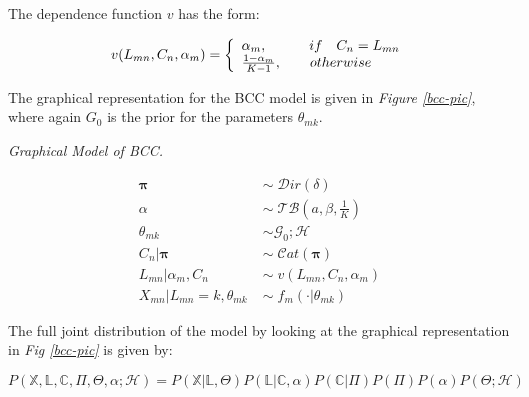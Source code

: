 The dependence function $v$ has the form:

\begin{equation}
	v(L_{mn}, C_{n}, \alpha_{m}) = \left\{
	\begin{array}{l l}
		\alpha_{m},\quad \quad \quad if\quad C_{n} = L_{mn}\\
		\frac{1-\alpha_{m}}{K-1},\quad \quad otherwise
	\end{array}\right.
\end{equation}

The graphical representation for the BCC model is given in \emph{Figure \ref{bcc-pic}}, where again $G_{0}$ is the prior for the parameters $\theta_{mk}$.

\begin{minipage}{0.5\textwidth}%
  \hfill
  \begin{center}
	
	\emph{Graphical Model of BCC.}
  \end{center}
\end{minipage}
\begin{minipage}{0.4\textwidth}%
  \begin{equation*}
  	\begin{aligned}
  		\mathbf{\pi} \; & \sim \; \mathcal{D}ir(\delta) \\
  		\alpha \; & \sim \; \mathcal{TB}(\mathit{a}, \beta, \frac{1}{K}) \\
  		\theta_{mk} \; & \sim \mathcal{G}_{0}; \mathcal{H} \\
  		C_{n}|\mathbf{\pi} \; & \sim \; \mathcal{C}at(\mathbf{\pi}) \\
  		L_{mn} | \alpha_{m}, C_{n} \; & \sim \; v(L_{mn}, C_{n}, \alpha_{m}) \\
  		X_{mn}|L_{mn}=k,\theta_{mk} \; & \sim \; f_{m}(\cdot | \theta_{mk}) 
  	\end{aligned} 
  \end{equation*} 
\end{minipage}
\vspace*{7mm}

The full joint distribution of the model by looking at the graphical representation in \emph{Fig \ref{bcc-pic}} is given by:

\begin{equation}\scriptstyle
	P(\mathbb{X}, \mathbb{L}, \mathbb{C}, \Pi , \Theta , \alpha ; \mathcal{H}) = P(\mathbb{X}|\mathbb{L},\Theta) P(\mathbb{L}|\mathbb{C},\alpha) P(\mathbb{C}|\Pi) P(\Pi) P(\alpha) P(\Theta ; \mathcal{H})
\end{equation}

